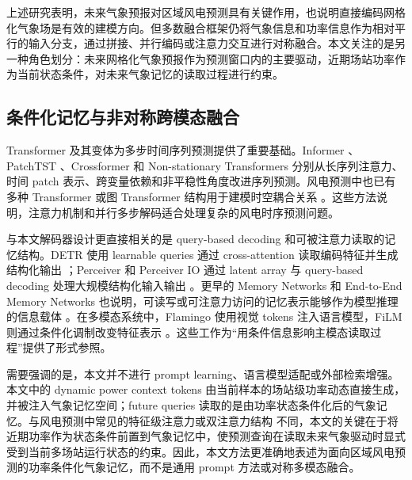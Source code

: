 上述研究表明，未来气象预报对区域风电预测具有关键作用，也说明直接编码网格化气象场是有效的建模方向。但多数融合框架仍将气象信息和功率信息作为相对平行的输入分支，通过拼接、并行编码或注意力交互进行对称融合。本文关注的是另一种角色划分：未来网格化气象预报作为预测窗口内的主要驱动，近期场站功率作为当前状态条件，对未来气象记忆的读取过程进行约束。

\subsection{条件化记忆与非对称跨模态融合}

Transformer 及其变体为多步时间序列预测提供了重要基础。Informer \cite{ref24}、PatchTST \cite{ref27}、Crossformer \cite{ref28} 和 Non-stationary Transformers \cite{ref34} 分别从长序列注意力、时间 patch 表示、跨变量依赖和非平稳性角度改进序列预测。风电预测中也已有多种 Transformer 或图 Transformer 结构用于建模时空耦合关系 \cite{ref37,ref38,ref39,ref40,ref41,ref42,ref43}。这些方法说明，注意力机制和并行多步解码适合处理复杂的风电时序预测问题。

与本文解码器设计更直接相关的是 query-based decoding 和可被注意力读取的记忆结构。DETR 使用 learnable queries 通过 cross-attention 读取编码特征并生成结构化输出 \cite{ref35}；Perceiver 和 Perceiver IO 通过 latent array 与 query-based decoding 处理大规模结构化输入输出 \cite{ref65,ref36}。更早的 Memory Networks 和 End-to-End Memory Networks 也说明，可读写或可注意力访问的记忆表示能够作为模型推理的信息载体 \cite{ref60,ref61}。在多模态系统中，Flamingo 使用视觉 tokens 注入语言模型，FiLM 则通过条件化调制改变特征表示 \cite{ref66,ref70}。这些工作为“用条件信息影响主模态读取过程”提供了形式参照。

需要强调的是，本文并不进行 prompt learning、语言模型适配或外部检索增强。本文中的 dynamic power context tokens 由当前样本的场站级功率动态直接生成，并被注入气象记忆空间；future queries 读取的是由功率状态条件化后的气象记忆。与风电预测中常见的特征级注意力或双注意力结构 \cite{ref72,ref73} 不同，本文的关键在于将近期功率作为状态条件前置到气象记忆中，使预测查询在读取未来气象驱动时显式受到当前多场站运行状态的约束。因此，本文方法更准确地表述为面向区域风电预测的功率条件化气象记忆，而不是通用 prompt 方法或对称多模态融合。
